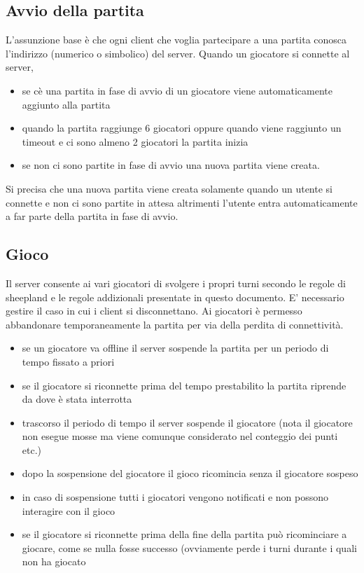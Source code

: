 \documentclass{article}
\begin{document}
\subsection{Avvio della partita}
L'assunzione base \`e che ogni client che voglia partecipare a una partita conosca l'indirizzo (numerico o simbolico) del server. Quando un giocatore si connette al server, 
\begin{itemize}
\item se c\`e una partita in fase di avvio di un giocatore viene automaticamente aggiunto alla partita
\item quando la partita raggiunge 6 giocatori oppure quando viene raggiunto un timeout  e ci sono almeno 2 giocatori la partita inizia
\item se non ci sono partite in fase di avvio una nuova partita viene creata.
\end{itemize}
Si precisa che una nuova partita viene creata solamente quando un utente si connette e non ci sono partite in attesa altrimenti l'utente entra automaticamente a far parte della partita in fase di avvio.

\subsection{Gioco}
Il server consente ai vari giocatori di svolgere i propri turni secondo le regole di sheepland e le regole addizionali presentate in questo documento. E' necessario gestire il caso in cui i client si disconnettano. Ai giocatori \`e permesso abbandonare temporaneamente la partita per via della perdita di connettivit\`a.
\begin{itemize}
\item se un giocatore va offline il server sospende la partita per un periodo di tempo fissato a priori
\item se il giocatore si riconnette prima del tempo prestabilito la partita riprende da dove \`e stata interrotta
\item trascorso il periodo di tempo il server sospende il giocatore (nota il giocatore non esegue mosse ma viene comunque considerato nel conteggio dei punti etc.)
\item dopo la sospensione del giocatore il gioco ricomincia senza il giocatore sospeso
\item in caso di sospensione tutti i giocatori vengono notificati e non possono interagire con il gioco
\item se il giocatore si riconnette prima della fine della partita pu\`o ricominciare a giocare, come se nulla fosse successo (ovviamente perde i turni durante i quali non ha giocato
\end{itemize}
\end{document}
